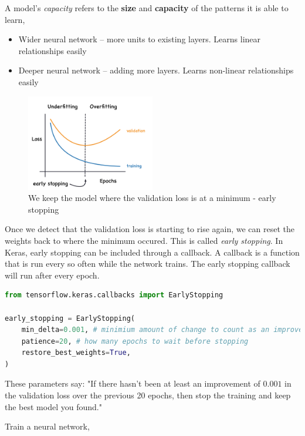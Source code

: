 \noindent A model's \emph{capacity} refers to the \textbf{size} and \textbf{capacity} of the
patterns it is able to learn,
\begin{itemize}
	\item Wider neural network -- more units to existing layers. Learns linear
		relationships easily
	\item Deeper neural network -- adding more layers. Learns non-linear
		relationships easily
\end{itemize}

\begin{figure}[htp]
	\centering
	\includegraphics[width=0.5\textwidth]{../assets/machine_learning_random/early_stopping.png}
	\caption{We keep the model where the validation loss is at a minimum - early stopping}
\end{figure}

\noindent Once we detect that the validation loss is starting to rise again, we can reset
the weights back to where the minimum occured. This is called \emph{early stopping}. In
Keras, early stopping can be included through a callback. A callback is a function that is
run every so often while the network trains. The early stopping callback will run after
every epoch.

\begin{lstlisting}[language=Python]
from tensorflow.keras.callbacks import EarlyStopping

early_stopping = EarlyStopping(
    min_delta=0.001, # minimium amount of change to count as an improvement
    patience=20, # how many epochs to wait before stopping
    restore_best_weights=True,
)
\end{lstlisting}

\noindent These parameters say: "If there hasn't been at least an improvement of $ 0.001 $
in the validation loss over the previous 20 epochs, then stop the training and keep the best
model you found."

\vspace{0.5cm}
\noindent Train a neural network,

